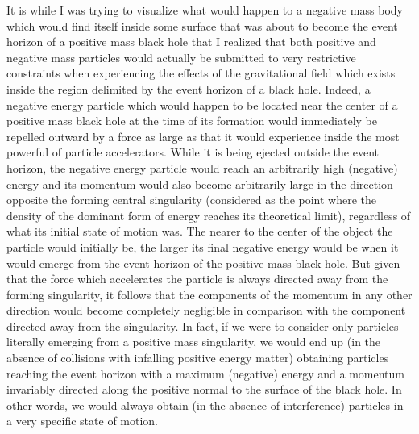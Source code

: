\documentclass[notitlepage,12pt]{report}
\begin{document}
\noindent It is while I was trying to visualize what would happen to a negative mass body which would find itself inside some surface that was about to become the event horizon of a positive mass black hole that I realized that both positive and negative mass particles would actually be submitted to very restrictive constraints when experiencing the effects of the gravitational field which exists inside the region delimited by the event horizon of a black hole. Indeed, a negative energy particle which would happen to be located near the center of a positive mass black hole at the time of its formation would immediately be repelled outward by a force as large as that it would experience inside the most powerful of particle accelerators. While it is being ejected outside the event horizon, the negative energy particle would reach an arbitrarily high (negative) energy and its momentum would also become arbitrarily large in the direction opposite the forming central singularity (considered as the point where the density of the dominant form of energy reaches its theoretical limit), regardless of what its initial state of motion was. The nearer to the center of the object the particle would initially be, the larger its final negative energy would be when it would emerge from the event horizon of the positive mass black hole. But given that the force which accelerates the particle is always directed away from the forming singularity, it follows that the components of the momentum in any other direction would become completely negligible in comparison with the component directed away from the singularity. In fact, if we were to consider only particles literally emerging from a positive mass singularity, we would end up (in the absence of collisions with infalling positive energy matter) obtaining particles reaching the event horizon with a maximum (negative) energy and a momentum invariably directed along the positive normal to the surface of the black hole. In other words, we would always obtain (in the absence of interference) particles in a very specific state of motion.
\end{document}
